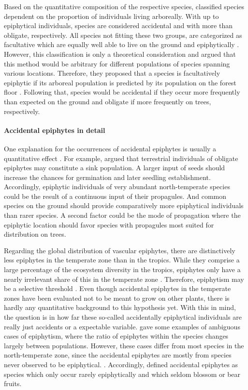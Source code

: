 \documentclass[12pt, a4paper, oneside, draft]{scrartcl}
\begin{document}
	Based on the quantitative composition of the respective species, \textcite{Ibisch1996} classified species dependent on the proportion of individuals living arboreally. With up to  epiphytical individuals, species are considered accidental and with more than  obligate, respectively. All species not fitting these two groups, are categorized as facultative which are equally well able to live on the ground and epiphytically  \parencite{Ibisch1996}. However, this classification is only a theoretical consideration and \textcite{Burns2010} argued that this method would be arbitrary for different populations of species spanning various locations. Therefore, they proposed that a species is facultatively epiphytic if its arboreal population is predicted by its population on the forest floor \parencite{Burns2010}. Following that, species would be accidental if they occur more frequently than expected on the ground and obligate if more frequently on trees, respectively.
	
	\paragraph{Accidental epiphytes in detail}
	One explanation for the occurrences of accidental epiphytes is usually a quantitative effect \cim. For example, \textcite{Burns2010} argued that terrestrial individuals of obligate epiphytes may constitute a sink population. A larger input of seeds should increase the chances for germination and later seedling establishment.  Accordingly, epiphytic individuals of very abundant north-temperate species could be the result of a continuous input of their propagules. And common species on the ground should provide comparatively more epiphytical individuals than rarer species. A second factor could be the mode of propagation where the epiphytic location should favor species with propagules most suited for distribution on trees. 
	
	Regarding the global distribution of vascular epiphytes, there are distinctively less epiphytes in the temperate zone than in the tropics. While they comprise a large percentage of the ecosystem diversity in the tropics, epiphytes only have a nearly irrelevant share of this in the temperate zone \parencite{Zotz2005}. Therefore, epiphytism may be a selective threshold . Even though accidental epiphytes in the temperate zones have been evaluated not to be meant to grow on other plants, there is hardly any quantitative background to this hypothesis yet. With this in mind, the question is in how far these so-called accidentally epiphytical individuals are really just accidents or a expectable variable. \textcite{Zotz2013} gave some examples of ambiguous cases of epiphytism, where the ratio of epiphytes within the species changes largely between populations. However, these cases differ from most species in the north-temperate zone, since the accidental epiphytes are mostly from species never observed to be epiphytical. . Accordingly, \textcite{Zotz2013} defined accidental epiphytes as species which only occur rarely epiphytically and which seldom blossom or bear fruits.
	
\end{document}
